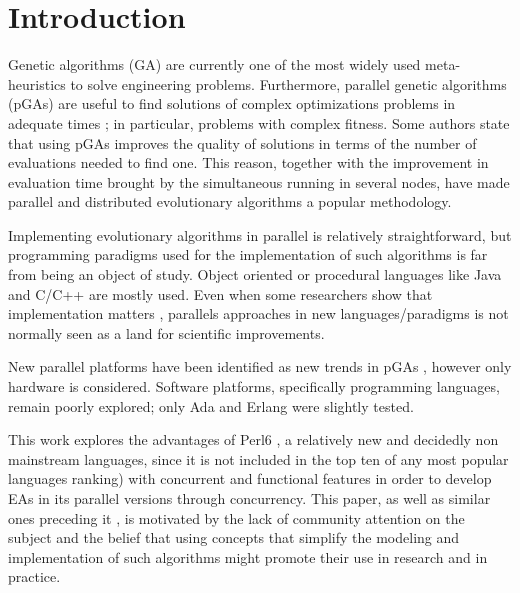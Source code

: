 \documentclass[sigconf]{acmart}
\begin{document}
\section{Introduction}

\noindent Genetic algorithms (GA) \cite{GA_Goldberg89} are currently
one of the most widely used meta-heuristics to solve engineering
problems. Furthermore, parallel genetic algorithms (pGAs) are useful
to find  solutions of complex optimizations problems in adequate times
\cite{Luque2011}; in particular, problems with complex fitness. Some
authors \cite{Alba2001} state that using pGAs improves the quality of
solutions in terms of the number of evaluations needed to find
one. This reason, together with the improvement in evaluation time
brought by the simultaneous running in several nodes, have made
parallel and distributed evolutionary algorithms a popular
methodology. 

Implementing  evolutionary algorithms in parallel is relatively straightforward,
but programming paradigms used for the implementation of such
algorithms is far from being an object of study. Object oriented or
procedural languages like Java and C/C++ are mostly used. Even when
some researchers show that implementation matters
\cite{DBLP:conf/iwann/MereloRACML11}, parallels approaches in new
languages/paradigms is not normally seen as a land for scientific
improvements. 

New parallel platforms have been identified as new trends in pGAs \cite{Luque2011}, however only hardware is considered. Software platforms, specifically programming languages, remain poorly explored; only Ada \cite{Santos2002} and Erlang \cite{A.Bienz2011,Kerdprasop2013} were slightly tested.


This work explores the advantages of Perl6
\cite{Tang:2007:PRI:1190216.1190218},  a relatively new and decidedly
non mainstream languages, since it is not included in the top ten of
any most popular languages ranking) with concurrent and functional
features in order to develop EAs in its parallel versions through
concurrency. This paper, as well as similar ones preceding it \cite{DBLP:conf/gecco/CruzGGC13,Albert-Cruz2014169}, is
motivated by the lack of community attention on the subject and the
belief that using concepts that simplify the modeling and
implementation of such algorithms might promote their use in research
and in practice. 
\end{document}
